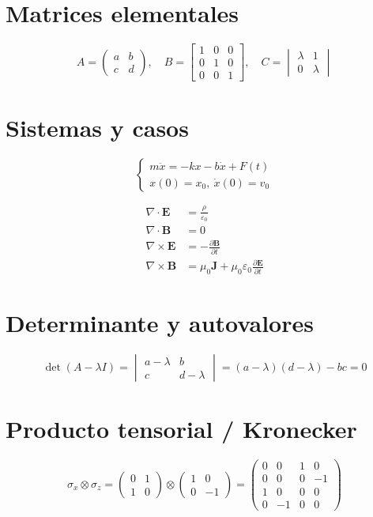 
\section*{Matrices elementales}
\[
A = \begin{pmatrix}
a & b \\
c & d
\end{pmatrix},
\quad
B = \begin{bmatrix}
1 & 0 & 0 \\
0 & 1 & 0 \\
0 & 0 & 1
\end{bmatrix},
\quad
C = \begin{vmatrix}
\lambda & 1 \\
0 & \lambda
\end{vmatrix}
\]

\section*{Sistemas y casos}
\[
\begin{cases}
m\ddot{x} = -kx - b\dot{x} + F(t) \\
x(0) = x_0,\ \dot{x}(0) = v_0
\end{cases}
\]

\begin{align}
\nabla \cdot \mathbf{E} &= \frac{\rho}{\varepsilon_0} \\
\nabla \cdot \mathbf{B} &= 0 \\
\nabla \times \mathbf{E} &= -\frac{\partial\mathbf{B}}{\partial t} \\
\nabla \times \mathbf{B} &= \mu_0\mathbf{J} + \mu_0\varepsilon_0\frac{\partial\mathbf{E}}{\partial t}
\end{align}

\section*{Determinante y autovalores}
\[
\det(A - \lambda I)
= \begin{vmatrix}
a-\lambda & b \\
c & d-\lambda
\end{vmatrix}
= (a-\lambda)(d-\lambda) - bc = 0
\]

\section*{Producto tensorial / Kronecker}
\[
\sigma_x \otimes \sigma_z
= \begin{pmatrix}
0 & 1 \\
1 & 0
\end{pmatrix}
\otimes
\begin{pmatrix}
1 & 0 \\
0 & -1
\end{pmatrix}
=
\begin{pmatrix}
0 & 0 & 1 & 0 \\
0 & 0 & 0 & -1 \\
1 & 0 & 0 & 0 \\
0 & -1 & 0 & 0
\end{pmatrix}
\]
